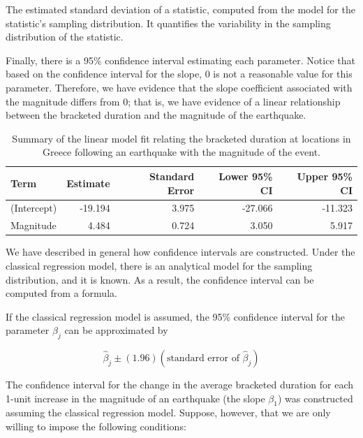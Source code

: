 \documentclass[]{book}
\theoremstyle{plain}
\theoremstyle{mydefn}
\theoremstyle{myexmpl}
\theoremstyle{remark}
\let\BeginKnitrBlock\begin \let\EndKnitrBlock\end
\let\BeginKnitrBlock\begin \let\EndKnitrBlock\end
\begin{document}
\BeginKnitrBlock{definition}[Standard Error]
\protect\hypertarget{def:defn-standard-error}{}{\label{def:defn-standard-error}
{} }The estimated standard deviation of a
statistic, computed from the model for the statistic's sampling
distribution. It quantifies the variability in the sampling distribution
of the statistic.
\EndKnitrBlock{definition}

Finally, there is a 95\% confidence interval estimating each parameter.
Notice that based on the confidence interval for the slope, 0 is not a
reasonable value for this parameter. Therefore, we have evidence that
the slope coefficient associated with the magnitude differs from 0; that
is, we have evidence of a linear relationship between the bracketed
duration and the magnitude of the earthquake.

\begin{table}

\caption{\label{tab:regconditions-slr-summary}Summary of the linear model fit relating the bracketed duration at locations in Greece following an earthquake with the magnitude of the event.}
\centering
\begin{tabular}[t]{l|r|r|r|r}
\hline
Term & Estimate & Standard Error & Lower 95\% CI & Upper 95\% CI\\
\hline
(Intercept) & -19.194 & 3.975 & -27.066 & -11.323\\
\hline
Magnitude & 4.484 & 0.724 & 3.050 & 5.917\\
\hline
\end{tabular}
\end{table}

We have described in general how confidence intervals are constructed.
Under the classical regression model, there is an analytical model for
the sampling distribution, and it is known. As a result, the confidence
interval can be computed from a formula.

\BeginKnitrBlock{rmdtip}
If the classical regression model is assumed, the 95\% confidence
interval for the parameter \(\beta_j\) can be approximated by

\[\widehat{\beta}_j \pm (1.96)\left(\text{standard error of } \widehat{\beta}_j\right)\]
\EndKnitrBlock{rmdtip}

The confidence interval for the change in the average bracketed duration
for each 1-unit increase in the magnitude of an earthquake (the slope
\(\beta_1\)) was constructed assuming the classical regression model.
Suppose, however, that we are only willing to impose the following
conditions:
\end{document}
